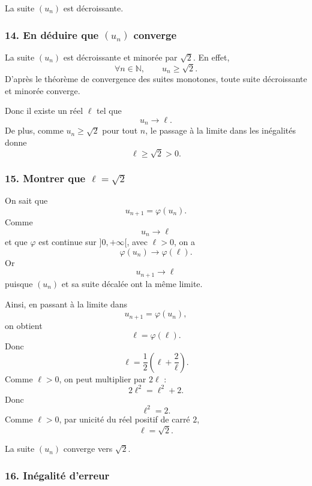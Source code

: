 \documentclass[11pt,a4paper]{article}
\newcommand{\N}{\mathbb{N}}
\begin{document}
\begin{resultatbox}
La suite \((u_n)\) est décroissante.
\end{resultatbox}


\subsubsection*{14. En déduire que \((u_n)\) converge}

La suite \((u_n)\) est décroissante et minorée par \(\sqrt2\). En effet,
\[
\forall n\in\N,\qquad u_n\geq\sqrt2.
\]
D'après le théorème de convergence des suites monotones, toute suite décroissante et minorée converge.

Donc il existe un réel \(\ell\) tel que
\[
u_n\longrightarrow \ell.
\]
De plus, comme \(u_n\geq\sqrt2\) pour tout \(n\), le passage à la limite dans les inégalités donne
\[
\ell\geq\sqrt2>0.
\]


\subsubsection*{15. Montrer que \(\ell=\sqrt2\)}

On sait que
\[
u_{n+1}=\varphi(u_n).
\]
Comme
\[
u_n\longrightarrow \ell
\]
et que \(\varphi\) est continue sur \(]0,+\infty[\), avec \(\ell>0\), on a
\[
\varphi(u_n)\longrightarrow \varphi(\ell).
\]
Or
\[
u_{n+1}\longrightarrow \ell
\]
puisque \((u_n)\) et sa suite décalée ont la même limite.

Ainsi, en passant à la limite dans
\[
u_{n+1}=\varphi(u_n),
\]
on obtient
\[
\ell=\varphi(\ell).
\]
Donc
\[
\ell=\frac12\left(\ell+\frac2\ell\right).
\]
Comme \(\ell>0\), on peut multiplier par \(2\ell\) :
\[
2\ell^2=\ell^2+2.
\]
Donc
\[
\ell^2=2.
\]
Comme \(\ell>0\), par unicité du réel positif de carré \(2\),
\[
\ell=\sqrt2.
\]

\begin{resultatbox}
La suite \((u_n)\) converge vers \(\sqrt2\).
\end{resultatbox}


\subsubsection*{16. Inégalité d'erreur}
\end{document}
